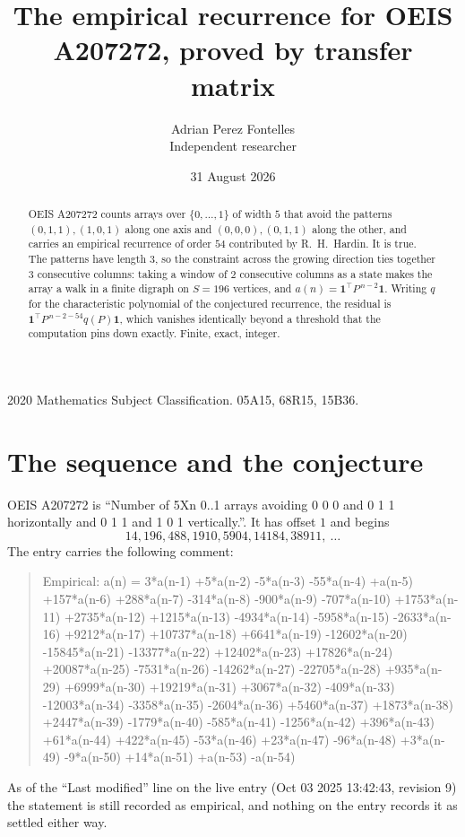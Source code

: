 \documentclass[11pt,a4paper]{article}
\title{The empirical recurrence for OEIS A207272, proved by transfer matrix}
\author{Adrian Perez Fontelles\\ \small Independent researcher}
\date{31 August 2026}
\theoremstyle{plain}
\theoremstyle{definition}
\begin{document}
\maketitle

\begin{abstract}
OEIS A207272 counts arrays over $\{0,\dots,1\}$ of width $5$ that avoid the patterns
$(0,1,1), (1,0,1)$ along one axis and $(0,0,0), (0,1,1)$ along the other, and carries an empirical recurrence of
order $54$ contributed by R.~H.~Hardin. It is true. The patterns have length $3$, so
the constraint across the growing direction ties together $3$ consecutive columns: taking a
window of $2$ consecutive columns as a state makes the array a walk in a finite digraph
on $S=196$ vertices, and $a(n)=\mathbf{1}^{\!\top}P^{\,n-2}\mathbf{1}$. Writing $q$
for the characteristic polynomial of the conjectured recurrence, the residual is
$\mathbf{1}^{\!\top}P^{\,n-2-54}q(P)\mathbf{1}$, which vanishes identically
beyond a threshold that the computation pins down exactly. Finite, exact, integer.
\end{abstract}

\noindent\small 2020 Mathematics Subject Classification. 05A15, 68R15, 15B36.\normalsize

\section{The sequence and the conjecture}

OEIS A207272 is ``Number of 5Xn 0..1 arrays avoiding 0 0 0 and 0 1 1 horizontally and 0 1 1 and 1 0 1 vertically.''. It has offset
$1$ and begins
\[
14, 196, 488, 1910, 5904, 14184, 38911,\ \dots
\]
The entry carries the following comment:
\begin{quote}\small
Empirical: a(n) = 3*a(n-1) +5*a(n-2) -5*a(n-3) -55*a(n-4) +a(n-5) +157*a(n-6) +288*a(n-7) -314*a(n-8) -900*a(n-9) -707*a(n-10) +1753*a(n-11) +2735*a(n-12) +1215*a(n-13) -4934*a(n-14) -5958*a(n-15) -2633*a(n-16) +9212*a(n-17) +10737*a(n-18) +6641*a(n-19) -12602*a(n-20) -15845*a(n-21) -13377*a(n-22) +12402*a(n-23) +17826*a(n-24) +20087*a(n-25) -7531*a(n-26) -14262*a(n-27) -22705*a(n-28) +935*a(n-29) +6999*a(n-30) +19219*a(n-31) +3067*a(n-32) -409*a(n-33) -12003*a(n-34) -3358*a(n-35) -2604*a(n-36) +5460*a(n-37) +1873*a(n-38) +2447*a(n-39) -1779*a(n-40) -585*a(n-41) -1256*a(n-42) +396*a(n-43) +61*a(n-44) +422*a(n-45) -53*a(n-46) +23*a(n-47) -96*a(n-48) +3*a(n-49) -9*a(n-50) +14*a(n-51) +a(n-53) -a(n-54)
\end{quote}
As of the ``Last modified'' line on the live entry (Oct 03 2025 13:42:43, revision
9) the statement is still recorded as empirical, and nothing on the entry
records it as settled either way.
\end{document}
